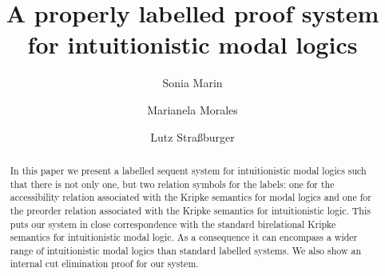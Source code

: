 \documentclass[a4paper]{article}
\theoremstyle{plain}
\theoremstyle{definition}
\newcommand{\marianela}[1]{{\color{purple}[Marianela: #1]}}
\newcommand{\todo}[1]{{\color{red}[TODO: #1]}}
\begin{document}
  \title{A properly labelled proof system for intuitionistic modal logics}
  \author{Sonia Marin \and %
      Marianela Morales %
 \and
        Lutz Stra{\ss}burger }

  \maketitle
  
 \begin{abstract}

   In this paper we present a labelled sequent system for
   intuitionistic modal logics such that there is not only one, but
   two relation symbols for the labels: one for the accessibility
   relation associated with the Kripke semantics for modal logics and
   one for the preorder relation associated with the Kripke semantics
   for intuitionistic logic.
   This puts our system in close correspondence with the standard
   birelational Kripke semantics for intuitionistic modal logic. As a
   consequence it can encompass a wider range of intuitionistic modal
   logics than standard labelled systems.
   We also show an internal cut elimination proof for our system.

  \end{abstract}


\end{document}
